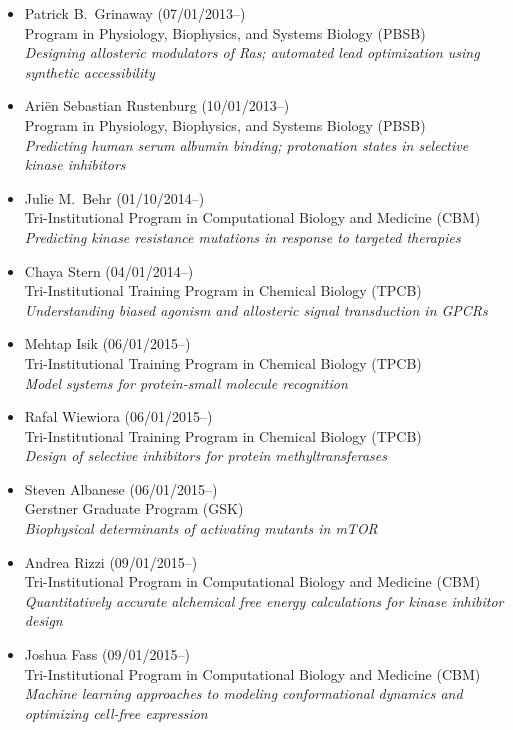 \documentclass[10pt]{article}
\begin{document}
\begin{itemize}
  \item Patrick B.~Grinaway (07/01/2013--)\\
  Program in Physiology, Biophysics, and Systems Biology (PBSB)\\
  \emph{Designing allosteric modulators of Ras; automated lead optimization using synthetic accessibility}

  \item Ari\"{e}n Sebastian Rustenburg (10/01/2013--)\\
  Program in Physiology, Biophysics, and Systems Biology (PBSB)\\
  \emph{Predicting human serum albumin binding; protonation states in selective kinase inhibitors}

  \item Julie M.~Behr (01/10/2014--)\\
  Tri-Institutional Program in Computational Biology and Medicine (CBM)\\
  \emph{Predicting kinase resistance mutations in response to targeted therapies} 
  
  \item Chaya Stern (04/01/2014--)\\
  Tri-Institutional Training Program in Chemical Biology (TPCB)\\
  \emph{Understanding biased agonism and allosteric signal transduction in GPCRs}
  
  \item Mehtap Isik (06/01/2015--)\\
  Tri-Institutional Training Program in Chemical Biology (TPCB)\\
  \emph{Model systems for protein-small molecule recognition}
  
  \item Rafal Wiewiora (06/01/2015--)\\
  Tri-Institutional Training Program in Chemical Biology (TPCB)\\
  \emph{Design of selective inhibitors for protein methyltransferases}
  
  \item Steven Albanese (06/01/2015--)\\
  Gerstner Graduate Program (GSK)\\
  \emph{Biophysical determinants of activating mutants in mTOR}
  
  \item Andrea Rizzi (09/01/2015--)\\
  Tri-Institutional Program in Computational Biology and Medicine (CBM)\\
  \emph{Quantitatively accurate alchemical free energy calculations for kinase inhibitor design}

  \item Joshua Fass (09/01/2015--)\\
  Tri-Institutional Program in Computational Biology and Medicine (CBM)\\
  \emph{Machine learning approaches to modeling conformational dynamics and optimizing cell-free expression}
  
\end{itemize}
\end{document}
